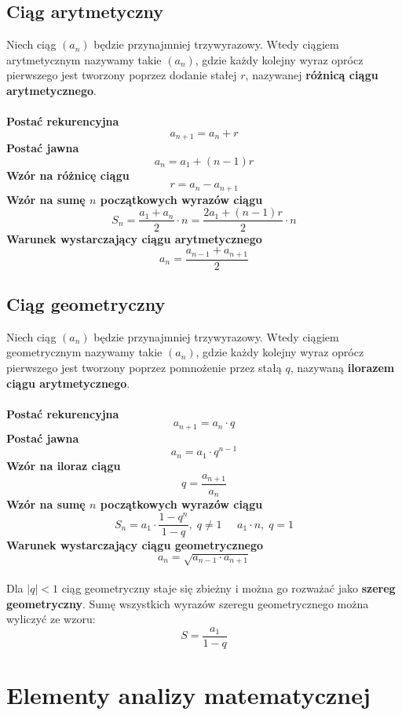 \documentclass[14pt,a4paper]{extarticle}
\begin{document}
\subsection{Ciąg arytmetyczny}
\noindent Niech ciąg $(a_{n})$ będzie przynajmniej trzywyrazowy. Wtedy ciągiem arytmetycznym nazywamy takie $(a_{n})$,
gdzie każdy kolejny wyraz oprócz pierwszego jest tworzony poprzez dodanie stałej $r$, nazywanej \textbf{różnicą ciągu arytmetycznego}.\\\\
\noindent\textbf{Postać rekurencyjna}
$$a_{n+1} = a_{n} + r$$
\noindent\textbf{Postać jawna}
$$a_{n} = a_{1} + (n - 1)r$$
\noindent\textbf{Wzór na różnicę ciągu}
$$r = a_{n} - a_{n+1}$$
\noindent\textbf{Wzór na sumę $n$ początkowych wyrazów ciągu}
$$S_{n} = \dfrac{a_{1} + a_{n}}{2}\cdot n = \dfrac{2a_{1} + (n - 1)r}{2}\cdot n$$
\noindent\textbf{Warunek wystarczający ciągu arytmetycznego}
$$a_{n} = \dfrac{a_{n-1}+a_{n+1}}{2}$$


\subsection{Ciąg geometryczny}
\noindent Niech ciąg $(a_{n})$ będzie przynajmniej trzywyrazowy. Wtedy ciągiem geometrycznym nazywamy takie $(a_{n})$,
gdzie każdy kolejny wyraz oprócz pierwszego jest tworzony poprzez pomnożenie przez stałą $q$, nazywaną \textbf{ilorazem ciągu arytmetycznego}.\\\\
\noindent\textbf{Postać rekurencyjna}
$$a_{n+1} = a_{n}\cdot q$$
\noindent\textbf{Postać jawna}
$$a_{n} = a_{1} \cdot q^{n-1}$$
\noindent\textbf{Wzór na iloraz ciągu}
$$q = \dfrac{a_{n+1}}{a_{n}}$$
\noindent\textbf{Wzór na sumę $n$ początkowych wyrazów ciągu}
$$S_{n} = a_{1}\cdot\dfrac{1-q^{n}}{1-q},\; q \neq 1\;\;\;\;\; a_{1}\cdot n,\; q = 1$$
\noindent\textbf{Warunek wystarczający ciągu geometrycznego}
$$a_{n} = \sqrt{a_{n-1}\cdot a_{n+1}}$$
\\

\noindent Dla $\vert q\vert < 1$ ciąg geometryczny staje się zbieżny i można go rozważać jako \textbf{szereg geometryczny}.
Sumę wszystkich wyrazów szeregu geometrycznego można wyliczyć ze wzoru:
$$S = \dfrac{a_{1}}{1-q}$$

\newpage






\section{Elementy analizy matematycznej}
\end{document}
